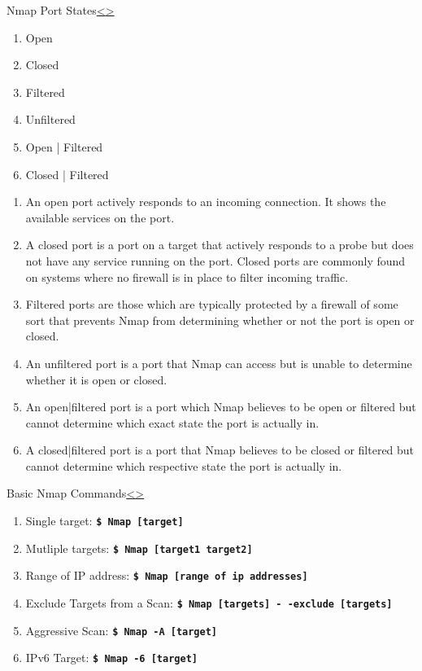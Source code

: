 \documentclass[12pt]{extarticle}
\newcommand{\code}[1]{\texttt{\bfseries#1}}
\newenvironment{instructionblock}{\Large\bgroup}{\egroup}
\begin{document}
\pagebreak
\begin{slide}{Nmap Port States}{\hyperref[slide 5]{\textless}\hyperref[slide 7]{\textgreater}}
	\begin{instructionblock}
		\begin{enumerate}
			\item Open
			\item Closed
			\item Filtered
			\item Unfiltered
			\item Open | Filtered
			\item Closed | Filtered
		\end{enumerate}
	\end{instructionblock}
\end{slide}
\begin{enumerate}
	\item An open port actively responds to an incoming connection. It shows the available services on the port. \cite{cookbook} 
	\item A closed port is a port on a target that actively responds to a probe but does not have any service running on the port. Closed ports are commonly found on systems where no firewall is in place to filter incoming traffic.\cite{cookbook} 
	\item Filtered ports are those which are typically protected by a firewall of some sort that prevents Nmap from determining whether or not the port is open or closed.\cite{cookbook} 
	\item An unfiltered port is a port that Nmap can access but is unable to determine whether it is open or closed.\cite{cookbook} 
	\item An open|filtered port is a port which Nmap believes to be open or filtered but cannot determine which exact state the port is actually in.\cite{cookbook} 
	\item A closed|filtered port is a port that Nmap believes to be closed or filtered but cannot determine which respective state the port is actually in.\cite{cookbook} 
\end{enumerate}


\pagebreak
\begin{slide}{Basic Nmap Commands}{\hyperref[slide 6]{\textless}\hyperref[slide 8]{\textgreater}}
	\begin{instructionblock}
		\begin{enumerate}
			\item Single target: \code{\$ Nmap [target]}
			\item Mutliple targets: \code{\$ Nmap [target1 target2]}
			\item Range of IP address: \code{\$ Nmap [range of ip addresses]}
			\item Exclude Targets from a Scan: \code{\$ Nmap [targets] - -exclude [targets]}
			\item Aggressive Scan: \code{\$ Nmap -A [target]}
			\item IPv6 Target: \code{\$ Nmap -6 [target]}
		\end{enumerate}
	\end{instructionblock}
\end{slide}
\end{document}
